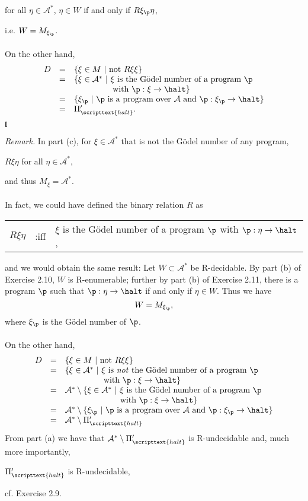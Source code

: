 \begin{enumerate}[1.]
\begin{enumerate}[(a)]
\begin{center}
for all $\eta \in \mathcal{A}^\ast$, $\eta \in W$ if and only if $R\xi_\p\eta$,
\end{center}
i.e. $W = M_{\xi_\p}$.\\
\ \\
On the other hand,
\[
\begin{array}{lll}
D & = & \{ \xi \in M \ |\ \mbox{not $R\xi\xi$} \} \cr
\ & = & \{ \xi \in \mathcal{A}^\ast \ |\ \mbox{$\xi$ is the G\"{o}del number of a program $\p$}\cr
\ & \ & \ \ \ \ \ \ \ \ \ \ \ \ \ \ \mbox{with $\p: \xi \to \halt$} \} \cr
\ & = & \{ \xi_\p \ |\ \mbox{$\p$ is a program over $\mathcal{A}$ and $\p: \xi_\p \to \halt$} \} \cr
\ & = & \Pi_\scripttext{halt}^\prime.
\end{array}
\]\nolinebreak\hfill$\talloblong$
\end{enumerate}
\textit{Remark.} In part (c), for $\xi \in \mathcal{A}^\ast$ that is not the G\"{o}del number of any program,
\begin{center}
$R\xi\eta$ for all $\eta \in \mathcal{A}^\ast$,
\end{center}
and thus $M_\xi = \mathcal{A}^\ast$.\\
\ \\
In fact, we could have defined the binary relation $R$ as
\begin{center}
\begin{tabular}{lll}
$R\xi\eta$ & :iff & $\xi$ is the G\"{o}del number of a program $\p$ with $\p : \eta \to \halt$,
\end{tabular}
\end{center}
and we would obtain the same result: Let $W \subset \mathcal{A}^\ast$ be R-decidable. By part (b) of Exercise 2.10, $W$ is R-enumerable; further by part (b) of Exercise 2.11, there is a program $\p$ such that $\p : \eta \to \halt$ if and only if $\eta \in W$. Thus we have
\[
W = M_{\xi_\p},
\]
where $\xi_\p$ is the G\"{o}del number of $\p$.\\
\ \\
On the other hand,
\[
\begin{array}{lll}
D & = & \{ \xi \in M \ | \ \mbox{not $R\xi\xi$} \} \cr
\ & = & \{ \xi \in \mathcal{A}^\ast \ | \ \mbox{$\xi$ is \emph{not} the G\"{o}del number of a program $\p$} \cr
\ & \ & \ \ \ \ \ \ \ \ \ \ \ \ \ \ \mbox{with $\p: \xi \to \halt$} \} \cr
\ & = & \mathcal{A}^\ast \setminus \{ \xi \in \mathcal{A}^\ast \ | \ \mbox{$\xi$ is the G\"{o}del number of a program $\p$} \cr
\ & \ & \ \ \ \ \ \ \ \ \ \ \ \ \ \ \ \ \ \ \ \ \mbox{with $\p : \xi \to \halt$} \} \cr
\ & = & \mathcal{A}^\ast \setminus \{ \xi_\p \ |\ \mbox{$\p$ is a program over $\mathcal{A}$ and $\p: \xi_\p \to \halt$} \} \cr
\ & = & \mathcal{A}^\ast \setminus \Pi^\prime_\scripttext{halt}
\end{array}
\]
From part (a) we have that $\mathcal{A}^\ast \setminus \Pi^\prime_\scripttext{halt}$ is R-undecidable and, much more importantly,
\begin{center}
$\Pi^\prime_\scripttext{halt}$ is R-undecidable,
\end{center}
cf. Exercise 2.9.
\end{enumerate}
